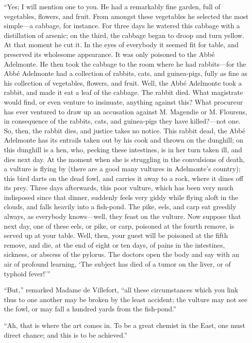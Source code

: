 “Yes; I will mention one to you. He had a remarkably fine garden, full
of vegetables, flowers, and fruit. From amongst these vegetables he
selected the most simple—a cabbage, for instance. For three days he
watered this cabbage with a distillation of arsenic; on the third, the
cabbage began to droop and turn yellow. At that moment he cut it. In
the eyes of everybody it seemed fit for table, and preserved its
wholesome appearance. It was only poisoned to the Abbé Adelmonte. He
then took the cabbage to the room where he had rabbits—for the Abbé
Adelmonte had a collection of rabbits, cats, and guinea-pigs, fully as
fine as his collection of vegetables, flowers, and fruit. Well, the
Abbé Adelmonte took a rabbit, and made it eat a leaf of the cabbage.
The rabbit died. What magistrate would find, or even venture to
insinuate, anything against this? What procureur has ever ventured to
draw up an accusation against M. Magendie or M. Flourens, in
consequence of the rabbits, cats, and guinea-pigs they have killed?—not
one. So, then, the rabbit dies, and justice takes no notice. This
rabbit dead, the Abbé Adelmonte has its entrails taken out by his cook
and thrown on the dunghill; on this dunghill is a hen, who, pecking
these intestines, is in her turn taken ill, and dies next day. At the
moment when she is struggling in the convulsions of death, a vulture is
flying by (there are a good many vultures in Adelmonte’s country); this
bird darts on the dead fowl, and carries it away to a rock, where it
dines off its prey. Three days afterwards, this poor vulture, which has
been very much indisposed since that dinner, suddenly feels very giddy
while flying aloft in the clouds, and falls heavily into a fish-pond.
The pike, eels, and carp eat greedily always, as everybody knows—well,
they feast on the vulture. Now suppose that next day, one of these
eels, or pike, or carp, poisoned at the fourth remove, is served up at
your table. Well, then, your guest will be poisoned at the fifth
remove, and die, at the end of eight or ten days, of pains in the
intestines, sickness, or abscess of the pylorus. The doctors open the
body and say with an air of profound learning, ‘The subject has died of
a tumor on the liver, or of typhoid fever!’”

“But,” remarked Madame de Villefort, “all these circumstances which you
link thus to one another may be broken by the least accident; the
vulture may not see the fowl, or may fall a hundred yards from the
fish-pond.”

“Ah, that is where the art comes in. To be a great chemist in the East,
one must direct chance; and this is to be achieved.”

